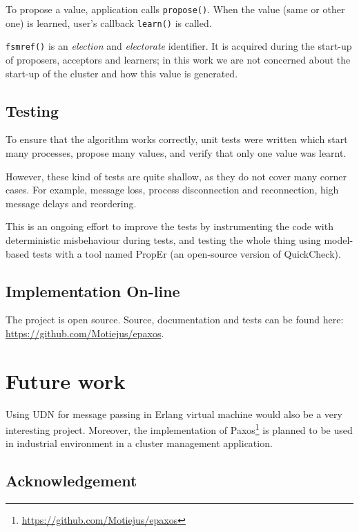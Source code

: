 \documentclass[english,11pt]{l4proj}
\begin{document}
To propose a value, application calls {\tt propose()}. When the value (same or
other one) is learned, user's callback {\tt learn()} is called.

{\tt fsmref()} is an \emph{election} and \emph{electorate} identifier. It is
acquired during the start-up of proposers, acceptors and learners; in this work
we are not concerned about the start-up of the cluster and how this value is
generated.

\subsection{Testing}

To ensure that the algorithm works correctly, unit tests were written which
start many processes, propose many values, and verify that only one value was
learnt.

However, these kind of tests are quite shallow, as they do not cover many corner
cases. For example, message loss, process disconnection and reconnection,
high message delays and reordering.

This is an ongoing effort to improve the tests by instrumenting the code with
deterministic misbehaviour during tests, and testing the whole thing using
model-based tests with a tool named PropEr\cite{proper} (an open-source version
of QuickCheck).

\subsection{Implementation On-line}

The project is open source. Source, documentation and tests can be found here:
\url{https://github.com/Motiejus/epaxos}.

\section{Future work}
\label{sec:future-work}

Using UDN for message passing in Erlang virtual machine would also be a very
interesting project. Moreover, the implementation of
Paxos\footnote{\url{https://github.com/Motiejus/epaxos}} is planned to be used
in industrial environment in a cluster management application.

\subsection{Acknowledgement}
\end{document}
